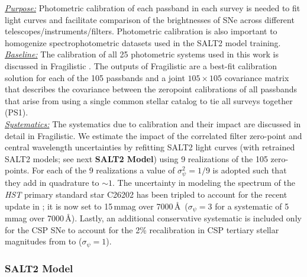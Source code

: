 \documentclass[twocolumn]{aastex63}
\begin{document}
\noindent\uline{\textit{Purpose:}} Photometric calibration of each passband in each survey is needed to fit light curves and facilitate comparison of the brightnesses of SNe across different telescopes/instruments/filters. Photometric calibration is also important to homogenize spectrophotometric datasets used in the SALT2 model training. \\
\uline{\textit{Baseline:}} The calibration of all 25 photometric systems used in this work is discussed in Fragilistic \citep{fragilistic}.  The outputs of Fragilistic are a best-fit calibration solution for each of the 105 passbands and a joint $105\times105$ covariance matrix that describes the covariance between the zeropoint calibrations of all passbands that arise from using a single common stellar catalog to tie all surveys together (PS1).   \\
\uline{\textit{Systematics:}} The systematics due to calibration and their impact are discussed in detail in Fragilistic. We estimate the impact of the correlated { filter zero-point and central wavelength} uncertainties by refitting SALT2 light curves  {(with retrained SALT2 models; see next \textbf{SALT2 Model})} using 9 realizations of the 105 zero-points. For each of the 9 realizations a value of $\sigma_\psi^2=1/9$ is adopted such that they add in quadrature to $\sim1$. The uncertainty in modeling the spectrum of the {\it HST} primary standard star C26202 has been tripled to account for the recent update in \cite{Bohlin21}; it is now set to 15\,mmag over 7000\,\AA\ ($\sigma_\psi=3$ for a systematic of 5\,mmag over 7000\,\AA). Lastly, an additional conservative systematic is included { only for the CSP SNe} to account for the 2\% recalibration in CSP tertiary stellar magnitudes from \cite{Stritzinger2010} to \cite{krisciunis17} ($\sigma_\psi=1$).  \\

\subsubsection{\textbf{SALT2 Model}}
\label{subsubsection:salt2}
\end{document}
